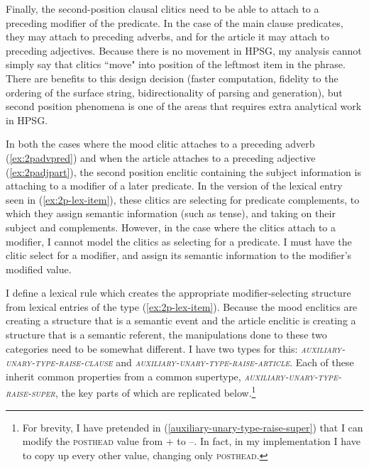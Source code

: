Finally, the second-position clausal clitics need to be able to attach to a preceding modifier of the predicate. In the case of the main clause predicates, they may attach to preceding adverbs, and for the article it may attach to preceding adjectives. Because there is no movement in HPSG, my analysis cannot simply say that clitics ``move" into position of the leftmost item in the phrase. There are benefits to this design decision (faster computation, fidelity to the ordering of the surface string, bidirectionality of parsing and generation), but second position phenomena is one of the areas that requires extra analytical work in HPSG.

In both the cases where the mood clitic attaches to a preceding adverb (\ref{ex:2padvpred}) and when the article attaches to a preceding adjective (\ref{ex:2padjpart}), the second position enclitic containing the subject information is attaching to a modifier of a later predicate. In the version of the lexical entry seen in (\ref{ex:2p-lex-item}), these clitics are selecting for predicate complements, to which they assign semantic information (such as tense), and taking on their subject and complements. However, in the case where the clitics attach to a modifier, I cannot model the clitics as selecting for a predicate. I must have the clitic select for a modifier, and assign its semantic information to the modifier's modified value.

I define a lexical rule which creates the appropriate modifier-selecting structure from lexical entries of the type (\ref{ex:2p-lex-item}). Because the mood enclitics are creating a structure that is a semantic event and the article enclitic is creating a structure that is a semantic referent, the manipulations done to these two categories need to be somewhat different. I have two types for this: \textsc{\textit{auxiliary-unary-type-raise-clause}} and \textsc{\textit{auxiliary-unary-type-raise-article}}. Each of these inherit common properties from a common supertype, \textsc{\textit{auxiliary-unary-type-raise-super}}, the key parts of which are replicated below.\footnote{For brevity, I have pretended in (\ref{auxiliary-unary-type-raise-super}) that I can modify the \textsc{posthead} value from + to --. In fact, in my implementation I have to copy up every other value, changing only \textsc{posthead}.}

